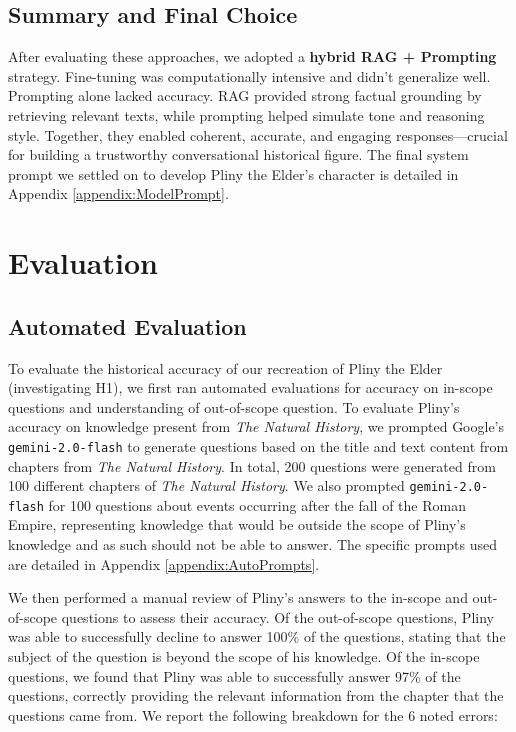 \documentclass[sigconf]{aamas}
\begin{document}
\subsection{Summary and Final Choice}

After evaluating these approaches, we adopted a \textbf{hybrid RAG + Prompting} strategy. Fine-tuning was computationally intensive and didn’t generalize well. Prompting alone lacked accuracy. RAG provided strong factual grounding by retrieving relevant texts, while prompting helped simulate tone and reasoning style. Together, they enabled coherent, accurate, and engaging responses—crucial for building a trustworthy conversational historical figure. The final system prompt we settled on to develop Pliny the Elder's character is detailed in Appendix \ref{appendix:ModelPrompt}.

\section{Evaluation}

\subsection{Automated Evaluation}

To evaluate the historical accuracy of our recreation of Pliny the Elder (investigating H1), we first ran automated evaluations for accuracy on in-scope questions and understanding of out-of-scope question. To evaluate Pliny's accuracy on knowledge present from \textit{The Natural History}, we prompted Google's \texttt{gemini-2.0-flash} \cite{GeminiFlash} to generate questions based on the title and text content from chapters from \textit{The Natural History}. In total, 200 questions were generated from 100 different chapters of \textit{The Natural History}. We also prompted \texttt{gemini-2.0-flash} for 100 questions about events occurring after the fall of the Roman Empire, representing knowledge that would be outside the scope of Pliny's knowledge and as such should not be able to answer. The specific prompts used are detailed in Appendix \ref{appendix:AutoPrompts}.

We then performed a manual review of Pliny's answers to the in-scope and out-of-scope questions to assess their accuracy. Of the out-of-scope questions, Pliny was able to successfully decline to answer 100\% of the questions, stating that the subject of the question is beyond the scope of his knowledge. Of the in-scope questions, we found that Pliny was able to successfully answer 97\% of the questions, correctly providing the relevant information from the chapter that the questions came from. We report the following breakdown for the 6 noted errors:
\end{document}
